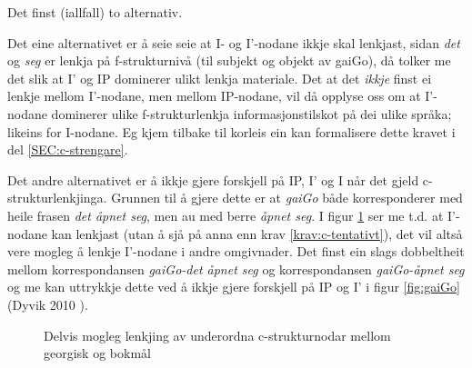 \documentclass[11pt,a4paper,oneside,draft]{book}
\newcommand{\proj}[2]{\begin{tabular}{c}\footnotesize{#1}\\\normalsize{#2}\end{tabular}}
\newcommand{\ua}{\ensuremath{\uparrow}}
\newcommand{\da}{\ensuremath{\downarrow}}
\begin{document}
Det finst (iallfall) to alternativ. 

Det eine alternativet er å seie seie at I- og I'-nodane ikkje skal
lenkjast, sidan \emph{det} og \emph{seg} er lenkja på f-strukturnivå (til
subjekt og objekt av gaiGo), då tolker me det slik at I' og IP
dominerer ulikt lenkja materiale. Det at det \emph{ikkje} finst ei lenkje
mellom I'-nodane, men mellom IP-nodane, vil då opplyse oss om at
I'-nodane dominerer ulike f-strukturlenkja informasjonstilskot på dei
ulike språka; likeins for I-nodane. Eg kjem tilbake til korleis ein
kan formalisere dette kravet i del \ref{SEC:c-strengare}.

 Det andre alternativet er å ikkje gjere forskjell på IP, I' og I når
 det gjeld c-strukturlenkjinga. Grunnen til å gjere dette er at
 \emph{gaiGo} både korresponderer med heile frasen \emph{det åpnet seg}, men au
 med berre \emph{åpnet seg}.  I figur \ref{fig:PanJara-gaiGo} ser me
 t.d. at I'-nodane kan lenkjast (utan å sjå på anna enn krav
 \ref{krav:c-tentativt}), det vil altså vere mogleg å lenkje I'-nodane
 i andre omgivnader. Det finst ein slags dobbeltheit mellom
 korrespondansen \emph{gaiGo-det åpnet seg} og korrespondansen \emph{gaiGo-åpnet  seg} og me kan uttrykkje dette ved å ikkje gjere forskjell på IP og
 I' i figur \ref{fig:gaiGo} (Dyvik 2010
 \citep{dyvik2010pc}).

\begin{figure}[htp]
\centering
{}
\caption{Delvis mogleg lenkjing av underordna c-strukturnodar mellom georgisk og bokmål}
 \label{fig:PanJara-gaiGo}
\end{figure}
\end{document}
